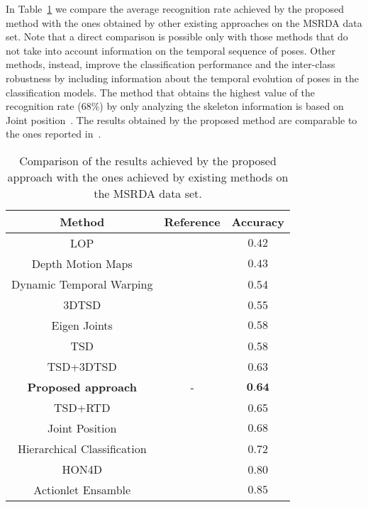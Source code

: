 \documentclass[runningheads,a4paper]{llncs}
\begin{document}
In Table~\ref{tab:comparison_msrda} we compare the average recognition rate achieved by the proposed method with the ones obtained by other existing approaches on the MSRDA data set. Note that a direct comparison is possible only with those methods that do not take into account information on the temporal sequence of poses. Other methods, instead, improve the classification performance and the inter-class robustness by including information about the temporal evolution of poses in the classification models. The method that obtains the highest value of the recognition rate ($68 \%$)  by only analyzing the skeleton information is based on Joint position~\cite{Wu12_dataset}. The results obtained by the proposed method are comparable to the ones reported in~\cite{Wu12_dataset}. 




\begin{table}[!t]
	\begin{scriptsize}

\centering
\setlength\tabcolsep{0.2cm}
\renewcommand{\arraystretch}{1.3}
\begin{tabular}{|c|c|c|}
\hline 
\textbf{Method} & \textbf{Reference} & \textbf{Accuracy} \\
\hline  
LOP & \cite{Wu12_dataset} & $0.42$ \\
Depth Motion Maps & \cite{Yang12} & $0.43$ \\
Dynamic Temporal Warping & \cite{Muller06} & 0.54 \\
3DTSD & \cite{Koperski14} & 0.55 \\
Eigen Joints & \cite{Yang12_CVPR} & $0.58$ \\
TSD & \cite{Koperski14} & 0.58 \\
TSD+3DTSD & \cite{Koperski14} & 0.63 \\
\textbf{Proposed approach} & - & $\textbf{0.64}$ \\
TSD+RTD & \cite{Koperski14} & 0.65 \\
Joint Position & \cite{Wu12_dataset} & $0.68$ \\
Hierarchical Classification & \cite{Koperski14} & 0.72 \\
HON4D & \cite{Oreifej13} & 0.80 \\
Actionlet Ensamble & \cite{Wu12_dataset} & $0.85$ \\
\hline
\end{tabular}
\vspace{2mm}
\caption{Comparison of the results achieved by the proposed approach with the ones achieved by existing methods  on the MSRDA data set.}
	\label{tab:comparison_msrda}
		\end{scriptsize}
\end{table}
\end{document}
